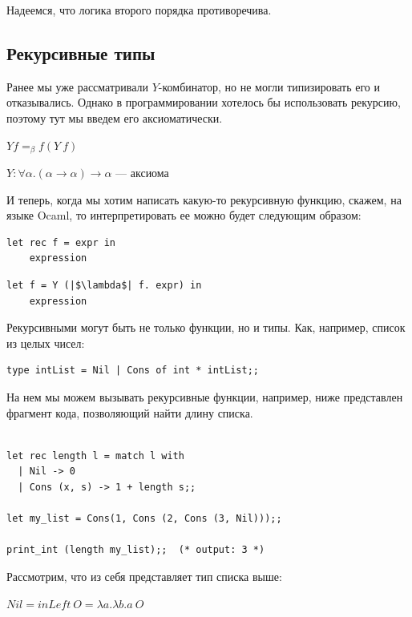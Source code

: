 Надеемся, что логика второго порядка противоречива. \\

\subsection{Рекурсивные типы}

Ранее мы уже рассматривали $Y$-комбинатор, но не могли типизировать его и отказывались. 
Однако в программировании хотелось бы использовать рекурсию, поэтому тут мы введем его аксиоматически.

$Y f =_\beta f (Y\ f)$

$Y : \forall \alpha . (\alpha \rightarrow \alpha) \rightarrow \alpha$ --- аксиома

И теперь, когда мы хотим написать какую-то рекурсивную функцию, скажем, на языке Ocaml, то интерпретировать ее можно будет следующим образом:

\begin{paracol}{2}
\begin{verbatim}
let rec f = expr in
    expression
\end{verbatim}
\switchcolumn
\begin{verbatim}
let f = Y (|$\lambda$| f. expr) in
    expression
\end{verbatim}
\end{paracol}

Рекурсивными могут быть не только функции, но и типы. Как, например, список из целых чисел:

\begin{verbatim}
type intList = Nil | Cons of int * intList;;
\end{verbatim}

На нем мы можем вызывать рекурсивные функции, например, ниже представлен фрагмент кода, позволяющий найти длину списка. 

\begin{verbatim}

let rec length l = match l with 
  | Nil -> 0
  | Cons (x, s) -> 1 + length s;;

let my_list = Cons(1, Cons (2, Cons (3, Nil)));;

print_int (length my_list);;  (* output: 3 *)
\end{verbatim}

Рассмотрим, что из себя представляет тип списка выше:


$Nil = inLeft\ O = \lambda a. \lambda b. a\ O$ 

